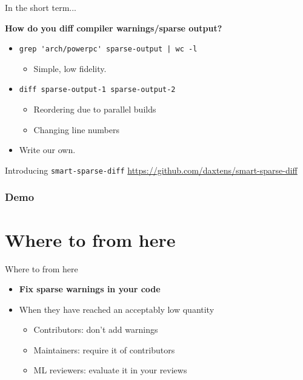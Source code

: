\documentclass[pdf,aspectratio=169]{beamer}
\begin{document}
\begin{frame}{In the short term...}

\textbf{How do you diff compiler warnings/sparse output?}

\begin{itemize}
\item \verb~grep 'arch/powerpc' sparse-output | wc -l~
  \begin{itemize}
  \item Simple, low fidelity.
  \end{itemize}
\item \verb~diff sparse-output-1 sparse-output-2~
  \begin{itemize}
  \item Reordering due to parallel builds
  \item Changing line numbers
  \end{itemize}

\item Write our own.
\end{itemize}
\end{frame}

\begin{frame}{Introducing \texttt{smart-sparse-diff}}
  \url{https://github.com/daxtens/smart-sparse-diff}
\end{frame}
\subsubsection{Demo}
\label{sec-4-3}

\section{Where to from here}
\label{sec-5}
\begin{frame}{Where to from here}
\begin{itemize}
\item \textbf{Fix sparse warnings in your code}
\item When they have reached an acceptably low quantity
\begin{itemize}
\item Contributors: don't add warnings
\item Maintainers: require it of contributors
\item ML reviewers: evaluate it in your reviews
\end{itemize}
\end{itemize}
\end{frame}
\end{document}

